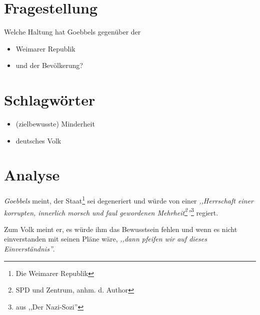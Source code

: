 \documentclass[12pt,twoside,a4paper]{article}
\title{\titleText}
\author{\authorText}
\date{\dateText}
\begin{document}
	\maketitle
	\tableofcontents
	
	\section{Fragestellung}
		Welche Haltung hat Goebbels gegenüber der 
		\begin{itemize}
			\item Weimarer Republik
			\item und der Bevölkerung?
		\end{itemize}
		
	\section{Schlagwörter}
	\begin{itemize}
		\item (zielbewusste) Minderheit
		\item deutsches Volk
	\end{itemize}
	\section{Analyse}
	
	\textit{Goebbels} meint, der Staat\footnote{Die Weimarer Republik} sei degeneriert und würde von einer \textit{,,Herrschaft einer korrupten, innerlich morsch und faul gewordenen Mehrheit\footnote{SPD und Zentrum, anhm. d. Author}''}\footnote{aus ,,Der Nazi-Sozi''} regiert.
	
	Zum Volk meint er, es würde ihm das Bewusstsein fehlen und wenn es nicht einverstanden mit seinen Pläne wäre, \textit{,,dann pfeifen wir auf dieses Einverständnis''}. 
	
\end{document}
